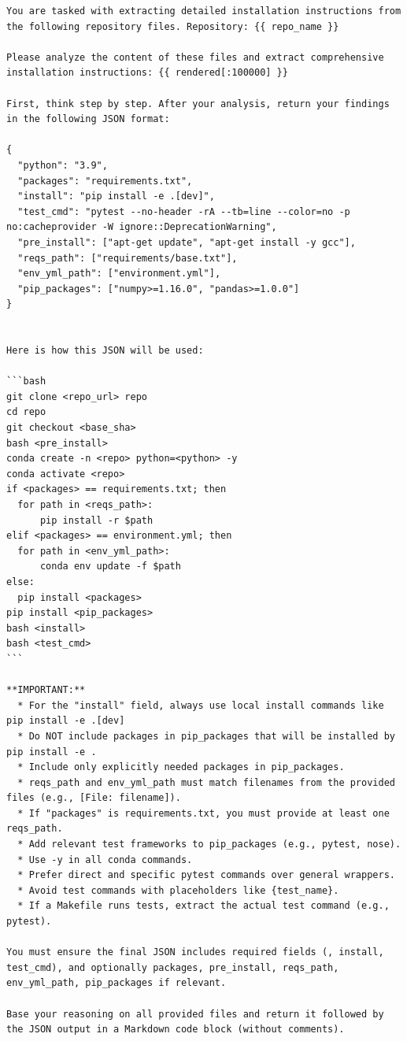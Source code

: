 \documentclass[dandb]{article}
\begin{document}
\label{sec:extract_install_recipe}

\begin{lstlisting}[upquote=true,caption=LLM prompt for extracting installation recipe]
You are tasked with extracting detailed installation instructions from the following repository files. Repository: {{ repo_name }}

Please analyze the content of these files and extract comprehensive installation instructions: {{ rendered[:100000] }}

First, think step by step. After your analysis, return your findings in the following JSON format:

{
  "python": "3.9",
  "packages": "requirements.txt",
  "install": "pip install -e .[dev]",
  "test_cmd": "pytest --no-header -rA --tb=line --color=no -p no:cacheprovider -W ignore::DeprecationWarning",
  "pre_install": ["apt-get update", "apt-get install -y gcc"],
  "reqs_path": ["requirements/base.txt"],
  "env_yml_path": ["environment.yml"],
  "pip_packages": ["numpy>=1.16.0", "pandas>=1.0.0"]
}


Here is how this JSON will be used:

```bash
git clone <repo_url> repo
cd repo
git checkout <base_sha>
bash <pre_install>
conda create -n <repo> python=<python> -y
conda activate <repo>
if <packages> == requirements.txt; then
  for path in <reqs_path>:
      pip install -r $path
elif <packages> == environment.yml; then
  for path in <env_yml_path>:
      conda env update -f $path
else:
  pip install <packages>
pip install <pip_packages>
bash <install>
bash <test_cmd>
```

**IMPORTANT:**
  * For the "install" field, always use local install commands like pip install -e .[dev]
  * Do NOT include packages in pip_packages that will be installed by pip install -e .
  * Include only explicitly needed packages in pip_packages.
  * reqs_path and env_yml_path must match filenames from the provided files (e.g., [File: filename]).
  * If "packages" is requirements.txt, you must provide at least one reqs_path.
  * Add relevant test frameworks to pip_packages (e.g., pytest, nose).
  * Use -y in all conda commands.
  * Prefer direct and specific pytest commands over general wrappers.
  * Avoid test commands with placeholders like {test_name}.
  * If a Makefile runs tests, extract the actual test command (e.g., pytest).

You must ensure the final JSON includes required fields (, install, test_cmd), and optionally packages, pre_install, reqs_path, env_yml_path, pip_packages if relevant.

Base your reasoning on all provided files and return it followed by the JSON output in a Markdown code block (without comments).
    
\end{lstlisting}
\end{document}
